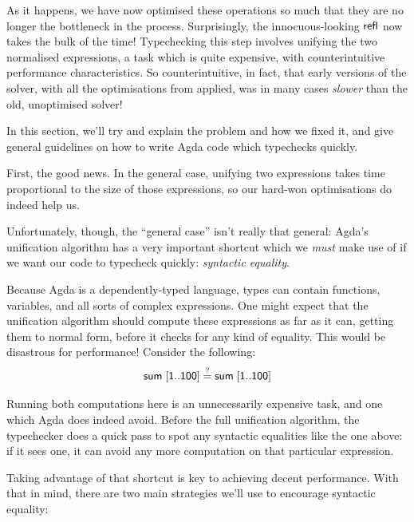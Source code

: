 \documentclass[acmsmall,review,anonymous]{acmart}\settopmatter{printfolios=true,printccs=false,printacmref=false}
\begin{document}
As it happens, we have now optimised these operations so much that they are no
longer the bottleneck in the process. Surprisingly, the innocuous-looking
\(\AgdaInductiveConstructor{refl}\) now takes the bulk of the time! Typechecking
this step involves unifying the two normalised expressions, a task which is
quite expensive, with counterintuitive performance characteristics. So
counterintuitive, in fact, that early versions of the solver, with all the
optimisations from \citet{gregoire_proving_2005} applied, was in many cases
\emph{slower} than the old, unoptimised solver!

In this section, we'll try and explain the problem and how we fixed it, and give
general guidelines on how to write Agda code which typechecks quickly.

First, the good news. In the general case, unifying two expressions takes time
proportional to the size of those expressions, so our hard-won optimisations do
indeed help us.

Unfortunately, though, the ``general case'' isn't really that general: Agda's
unification algorithm has a very important shortcut which we \emph{must} make
use of if we want our code to typecheck quickly: \emph{syntactic equality}.

Because Agda is a dependently-typed language, types can contain functions,
variables, and all sorts of complex expressions. One might expect that the
unification algorithm should compute these expressions as far as it can, getting
them to normal form, before it checks for any kind of equality. This would be
disastrous for performance! Consider the following:
\[ \AgdaFunction{sum} \; [ \AgdaNumber{1} .. \AgdaNumber{100} ] \stackrel{?}{=}
  \AgdaFunction{sum} \; [ \AgdaNumber{1} .. \AgdaNumber{100} ] \]

Running both computations here is an unnecessarily expensive task, and one which
Agda does indeed avoid. Before the full unification algorithm, the typechecker
does a quick pass to spot any syntactic equalities like the one above: if it
sees one, it can avoid any more computation on that particular expression.

Taking advantage of that shortcut is key to achieving decent performance. With
that in mind, there are two main strategies we'll use to encourage syntactic
equality:
\end{document}
